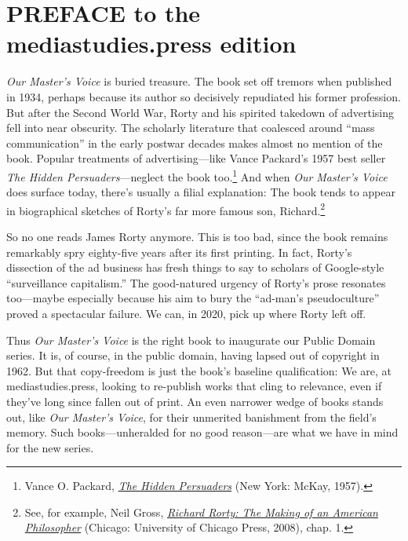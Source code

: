 \documentclass[twoside,nohyper,openany,nobib]{tufte-book}
\let\oldchapter\chapter
\def\chapter{%
  \setcounter{footnote}{0}%
  \oldchapter
}
\begin{document}
\chapter{PREFACE to the mediastudies.press edition}
\label{ch:prefacemsp}

  
 \emph{Our Master's Voice} is buried treasure. The book set
off tremors when published in 1934, perhaps because its author so
decisively repudiated his former profession. But after the Second World
War, Rorty and his spirited takedown of advertising fell into near
obscurity. The scholarly literature that coalesced around ``mass
communication'' in the early postwar decades makes almost no mention of
the book. Popular treatments of advertising---like Vance Packard's 1957
best seller \emph{The Hidden Persuaders}---neglect the book too.\footnote{Vance O. Packard, \emph{\href{http://www.worldcat.org/oclc/245181}{The
  Hidden Persuaders}} (New York: McKay, 1957).} And
when \emph{Our Master's Voice} does surface today, there's usually a
filial explanation: The book tends to appear in biographical sketches of
Rorty's far more famous son, Richard.\footnote{See, for example, Neil Gross,
  \emph{\href{http://www.worldcat.org/oclc/474963500}{Richard Rorty: The
  Making of an American Philosopher}} (Chicago: University of Chicago
  Press, 2008), chap. 1.}

So no one reads James Rorty anymore. This is too bad, since the book
remains remarkably spry eighty-five years after its first printing. In
fact, Rorty's dissection of the ad business has fresh things to say to
scholars of Google-style ``surveillance capitalism.'' The good-natured
urgency of Rorty's prose resonates too---maybe especially because his
aim to bury the ``ad-man's pseudoculture'' proved a spectacular failure.
We can, in 2020, pick up where Rorty left off.

Thus \emph{Our Master's Voice} is the right book to inaugurate our
Public Domain series. It is, of course, in the public domain, having
lapsed out of copyright in 1962. But that copy-freedom is just the
book's baseline qualification: We are, at mediastudies.press, looking to
re-publish works that cling to relevance, even if they've long since
fallen out of print. An even narrower wedge of books stands out, like
\emph{Our Master's Voice}, for their unmerited banishment from the
field's memory. Such books---unheralded for no good reason---are what we
have in mind for the new series.
\end{document}
